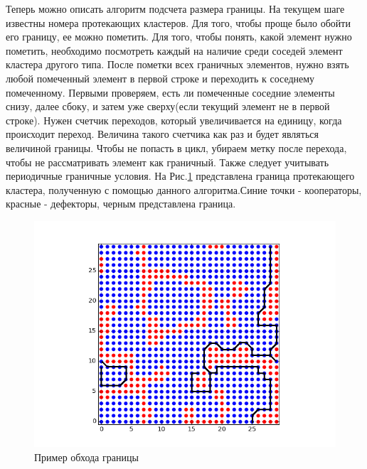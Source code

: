 \documentclass[14pt]{article}
\begin{document}
\par Теперь можно описать алгоритм подсчета размера границы. На текущем шаге известны номера протекающих кластеров. Для того, чтобы проще было обойти его границу, ее можно пометить. Для того, чтобы понять, какой элемент нужно пометить, необходимо посмотреть каждый на наличие среди соседей элемент кластера другого типа. После пометки всех граничных элементов, нужно взять любой помеченный элемент в первой строке и переходить к соседнему помеченному. Первыми проверяем, есть ли помеченные соседние элементы снизу, далее сбоку, и затем уже сверху(если текущий элемент не в первой строке). Нужен счетчик переходов, который увеличивается на единицу, когда происходит переход. Величина такого счетчика как раз и будет являться величиной границы. Чтобы не попасть в цикл, убираем метку после перехода, чтобы не рассматривать элемент как граничный. Также следует учитывать периодичные граничные условия.  На Рис.\ref{fig:bord} представлена граница протекающего кластера, полученную с помощью данного алгоритма.Синие точки - кооператоры, красные - дефекторы, черным представлена граница.

\begin{figure}[H]
	\includegraphics[center]{t1.png}
	\caption{Пример обхода границы}
	\label{fig:bord}
\end{figure}
\end{document}
